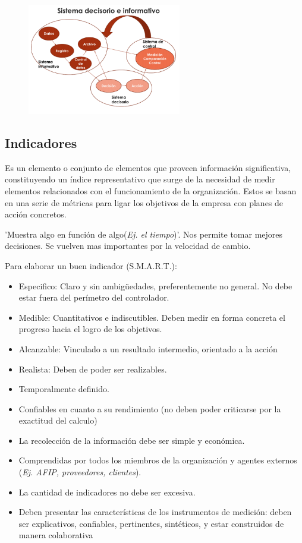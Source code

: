 \documentclass[titlepage,a4paper]{article}
\begin{document}
\begin{figure}[!htb]
    \centering
    \includegraphics[width=0.6\textwidth]{imagenes/SistemaDecisiorioInformativo.PNG}
\end{figure}

\subsection{Indicadores}
Es un elemento o conjunto de elementos que proveen información significativa, constituyendo un índice representativo que surge de la necesidad de medir elementos relacionados con el funcionamiento de la organización. Estos se basan en una serie de métricas para ligar los objetivos de la empresa con planes de acción concretos.

'Muestra algo en función de algo(\textit{Ej. el tiempo})'. Nos permite tomar mejores decisiones. Se vuelven mas importantes por la velocidad de cambio.

Para elaborar un buen indicador (S.M.A.R.T.): 
\begin{itemize}
    \item Especifico: Claro y sin ambigüedades, preferentemente no general. No debe estar fuera del perímetro del controlador.
    \item Medible: Cuantitativos e indiscutibles. Deben medir en forma concreta el progreso hacia el logro de los objetivos.
    \item Alcanzable: Vinculado a un resultado intermedio, orientado a la acción
    \item Realista: Deben de poder ser realizables.
    \item Temporalmente definido.
    \item Confiables en cuanto a su rendimiento (no deben poder criticarse por la exactitud del calculo)
    \item La recolección de la información debe ser simple y económica.
    \item Comprendidas por todos los miembros de la organización y agentes externos (\textit{Ej. AFIP, proveedores, clientes}).
    \item La cantidad de indicadores no debe ser excesiva.
    \item Deben presentar las características de los instrumentos de medición: deben ser explicativos, confiables, pertinentes, sintéticos, y estar construidos de manera colaborativa
\end{itemize}
\end{document}
